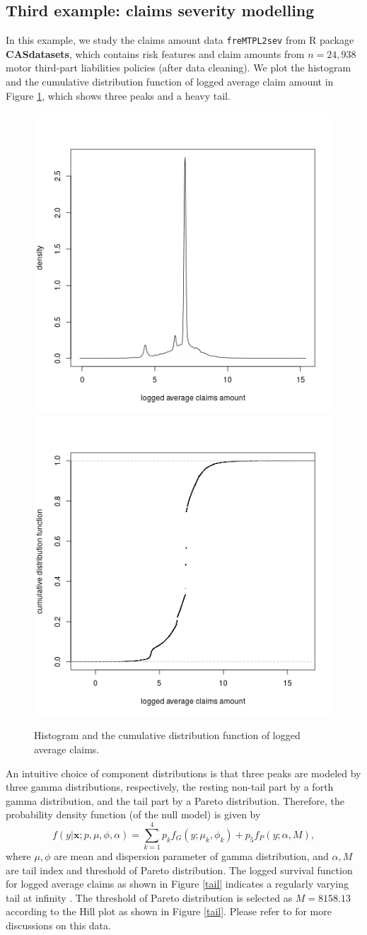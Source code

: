 \documentclass[11pt]{article}
\numberwithin{equation}{section}
\def\bx{\boldsymbol{x}}
\begin{document}
\subsection{Third example: claims severity modelling}\label{sec:third example}
In this example, we study the claims amount data {\tt freMTPL2sev} from R package {\bf CASdatasets}, which contains risk features and  claim amounts from $n=24,938$ motor third-part liabilities policies (after data cleaning). 
We plot the histogram and the cumulative distribution function of logged average claim  amount in Figure \ref{hist}, which shows three peaks and a heavy tail. 
	\begin{figure}[h!]
		\centering
		\includegraphics[width=0.4\linewidth]{../plots/sev/hist.png}
		\includegraphics[width=0.4\linewidth]{../plots/sev/cdf.png}
		\caption{Histogram and the cumulative distribution function of logged average claims.}\label{hist}
	\end{figure}
An intuitive choice of component distributions is that 
three peaks are modeled by three gamma distributions, respectively, the resting non-tail part by a forth gamma distribution, and the tail part by a Pareto distribution.
Therefore, the probability density function (of the null model) is given by
\begin{equation}\label{sev-0}
	f(y|\bx;p,\mu,\phi,\alpha)=\sum_{k=1}^4p_kf_{G}(y;\mu_k,\phi_k)+p_5f_{P}(y;\alpha,M),
\end{equation}
	where $\mu,\phi$ are mean and dispersion parameter of gamma distribution, and $\alpha, M$ are tail index and threshold of Pareto distribution. 
	The logged survival function for logged average claims as shown in Figure \ref{tail} indicates a regularly varying  tail at infinity \citep{embrechts2013modelling}.
	The threshold of Pareto distribution is selected as $M=8158.13$ according to the Hill plot \citep{resnick1997heavy} as shown in Figure \ref{tail}. Please refer to \citet{wuthrich2022statistical} for more discussions on this data.
	
\end{document}
